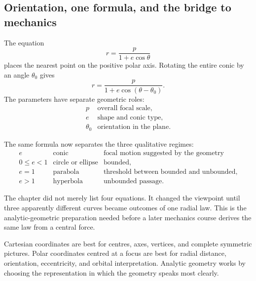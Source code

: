\subsection{Orientation, one formula, and the bridge to mechanics}

The equation
\[
r=\frac{p}{1+e\cos\theta}
\]
places the nearest point on the positive polar axis. Rotating the entire conic by
an angle $\theta_0$ gives
\[
\boxed{r=\frac{p}{1+e\cos(\theta-\theta_0)}}.
\]
The parameters have separate geometric roles:
\[
\begin{array}{c|c}
p & \text{overall focal scale},\\
e & \text{shape and conic type},\\
\theta_0 & \text{orientation in the plane}.
\end{array}
\]

\begin{center}
\end{center}

The same formula now separates the three qualitative regimes:
\[
\begin{array}{c|c|c}
e & \text{conic} & \text{focal motion suggested by the geometry}\\
\hline
0\leq e<1 & \text{circle or ellipse} & \text{bounded},\\
e=1 & \text{parabola} & \text{threshold between bounded and unbounded},\\
e>1 & \text{hyperbola} & \text{unbounded passage}.
\end{array}
\]

\begin{corebox}
The chapter did not merely list four equations. It changed the viewpoint until
three apparently different curves became outcomes of one radial law. This is the
analytic-geometric preparation needed before a later mechanics course derives
the same law from a central force.
\end{corebox}

\begin{summarybox}
Cartesian coordinates are best for centres, axes, vertices, and complete
symmetric pictures. Polar coordinates centred at a focus are best for radial
distance, orientation, eccentricity, and orbital interpretation. Analytic
geometry works by choosing the representation in which the geometry speaks most
clearly.
\end{summarybox}
